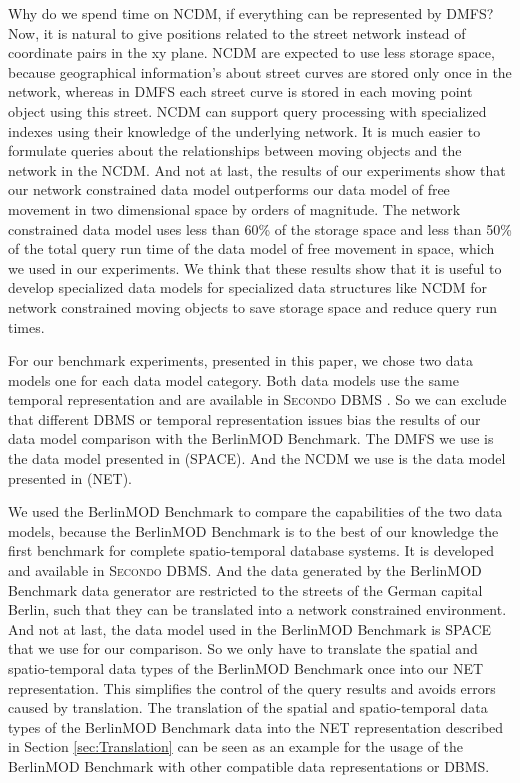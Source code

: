 \documentclass[a4paper]{article}
\newcommand{\secondo}{\textsc{Secondo}}
\newcommand{\bmodb} {BerlinMOD Benchmark}
\begin{document}
Why do we spend time on NCDM, if everything can be represented by DMFS?
Now, it is natural to give positions related to the street
network instead of coordinate pairs in the xy plane. NCDM are expected to use
less storage space,
because geographical information's about street curves are stored only once in
the network, whereas in DMFS each street curve is stored in each moving point
object using this street. NCDM can support query processing with specialized indexes
using their knowledge of the underlying network. It is much easier to
formulate queries about the relationships between moving objects and the network
in the NCDM. And not at last, the results of our experiments show that
our network constrained data model outperforms our data model of free movement in
two dimensional space by orders of magnitude. The network constrained data model
uses less than 60\% of the storage space and less than 50\% of the total query
run time of the data model of free movement in space, which we used in our
experiments.
We think that these results show that it is useful to develop specialized data
models for specialized data structures like NCDM for
network constrained moving objects to save storage space and reduce query run times.

For our benchmark experiments, presented in this paper, we chose two data models
one for each data model category. Both data models use the same temporal
representation
and are available in \secondo{} DBMS
\cite{SecondoEnvironmentDieker,SecondoPlatformPrototypingGueting}.
So we can exclude that different DBMS or temporal representation issues bias the
results of our data model comparison with the \bmodb{}\cite{BerlinMODVLDBDuentgen}.
The DMFS we use is the data model presented in
\cite{RepresentingMovingObjectsGueting,DataModelDataStructureGueting}
(SPACE). And the NCDM we use is the data model presented in
\cite{NetworkGueting} (NET).

We used the \bmodb{} \cite{BerlinMODVLDBDuentgen} to compare the capabilities of
the two data models, because the \bmodb{} is to the best of our knowledge the
first benchmark for complete spatio-temporal database systems.
It is developed and available in \secondo{} DBMS. And the data generated by the
\bmodb{} data generator are restricted to the streets of the German capital Berlin,
such that they can be translated into a network constrained environment.
And not at last, the data model used in the \bmodb{} is SPACE that we use
for our comparison. So we only have to translate the spatial and spatio-temporal
data types of the \bmodb{} once into our NET representation. This simplifies the
control of the query results and avoids errors caused by translation.
The translation of the spatial and spatio-temporal data types of the \bmodb{} data
into the NET representation described in Section \ref{sec:Translation} can be
seen as an example for the usage of the \bmodb{} with other compatible data
representations or DBMS.
\end{document}

